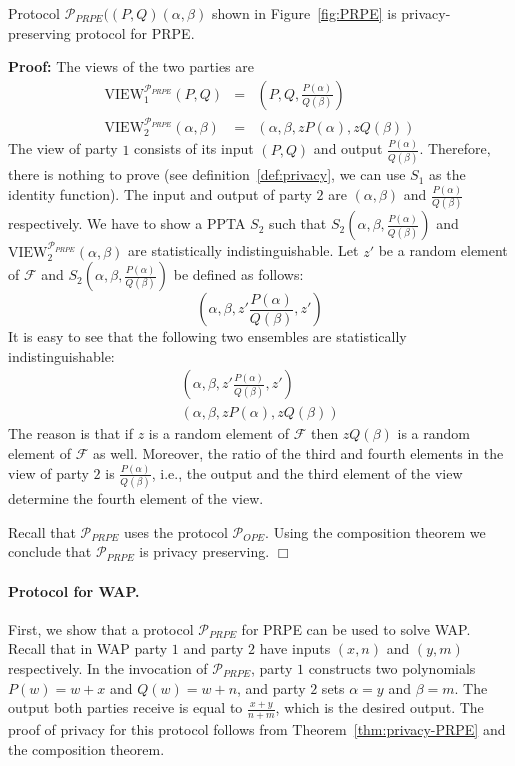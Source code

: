 \begin{theorem}
\rm
\label{thm:privacy-PRPE}
Protocol $\mathcal{P}_{PRPE}((P,Q)(\alpha,\beta)$ shown in Figure~\ref{fig:PRPE}
is privacy-preserving protocol for PRPE.
\end{theorem}
{\bf Proof:} The views of the two parties are
\begin{eqnarray*}
\mbox{VIEW}_1^{\mathcal{P}_{PRPE}} (P,Q) & = & (P,Q,\frac{P(\alpha)}{Q(\beta)}) \\
\mbox{VIEW}_2^{\mathcal{P}_{PRPE}} (\alpha,\beta) & = & (\alpha,\beta, z P(\alpha), z Q(\beta))
\end{eqnarray*}
The view of party $1$ consists of its input $(P,Q)$ and output $\frac{P(\alpha)}{Q(\beta)}$.
Therefore, there is nothing to prove (see definition~\ref{def:privacy}, we can use
$S_1$ as the identity function). The input and
output of party $2$ are $(\alpha,\beta)$ and $\frac{P(\alpha)}{Q(\beta)}$ respectively.
We have to show a PPTA $S_2$ such that
$S_2 (\alpha,\beta,\frac{P(\alpha)}{Q(\beta)})$ and $\mbox{VIEW}_2^{\mathcal{P}_{PRPE}} (\alpha,\beta)$
are statistically indistinguishable. Let $z'$ be a random element of $\mathcal{F}$ and $S_2 (\alpha,\beta,\frac{P(\alpha)}{Q(\beta)})$
be defined as follows:
\[
(\alpha,\beta, z' \frac{P(\alpha)}{Q(\beta)},z')
\]
It is easy to see that the following two ensembles are statistically indistinguishable:
\[
\begin{array}{l}
(\alpha,\beta, z' \frac{P(\alpha)}{Q(\beta)},z') \\
(\alpha,\beta, z P(\alpha), z Q(\beta))
\end{array}
\]
The reason is that if $z$ is a random element of $\mathcal{F}$ then $z
Q(\beta)$ is a random element of $\mathcal{F}$ as well. Moreover, the
ratio of the third and fourth elements in the view of party $2$ is
$\frac{P(\alpha)}{Q (\beta)}$, i.e., the output and the third element
of the view determine the fourth element of the view.

Recall that $\mathcal{P}_{PRPE}$ uses the protocol $\mathcal{P}_{OPE}$.
Using the composition theorem we conclude that $\mathcal{P}_{PRPE}$ 
is privacy preserving.
$\Box$

\paragraph{Protocol for WAP.} First, we show that a protocol $\mathcal{P}_{PRPE}$ for PRPE can be
used to solve WAP. Recall that in WAP party $1$ and party $2$ have inputs
$(x,n)$ and $(y,m)$ respectively. In the invocation of $\mathcal{P}_{PRPE}$, party $1$
constructs two polynomials $P(w) = w + x$ and $Q(w) = w + n$, and party $2$
sets $\alpha = y$ and $\beta = m$. The output both parties receive is equal
to $\frac{x+y}{n+m}$, which is the desired output. The proof of privacy
for this protocol follows from Theorem~\ref{thm:privacy-PRPE} and the composition
theorem.


